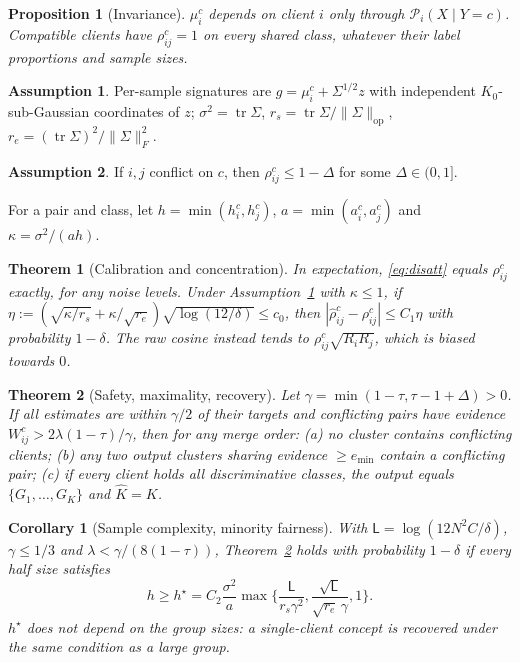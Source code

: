 \documentclass[journal]{IEEEtran}
\newtheorem{theorem}{Theorem}
\newtheorem{proposition}{Proposition}
\newtheorem{corollary}{Corollary}
\theoremstyle{definition}
\newtheorem{assumption}{Assumption}
\newcommand{\cP}{\mathcal{P}}
\newcommand{\tr}{\operatorname{tr}}
\newcommand{\op}{\mathrm{op}}
\newcommand{\rhohat}{\hat\rho}
\begin{document}
\begin{proposition}[Invariance]\label{prop:inv}
$\mu_i^c$ depends on client $i$ only through $\cP_i(X\mid Y=c)$. Compatible clients have $\rho^c_{ij}=1$ on every shared class, whatever their label proportions and sample sizes.
\end{proposition}
\begin{assumption}\label{ass:noise}
Per-sample signatures are $g=\mu_i^c+\Sigma^{1/2}z$ with independent $K_0$-sub-Gaussian coordinates of $z$; $\sigma^2=\tr\Sigma$, $r_s=\tr\Sigma/\|\Sigma\|_\op$, $r_e=(\tr\Sigma)^2/\|\Sigma\|_F^2$.
\end{assumption}
\begin{assumption}\label{ass:sep}
If $i,j$ conflict on $c$, then $\rho^c_{ij}\le1-\Delta$ for some $\Delta\in(0,1]$.
\end{assumption}
For a pair and class, let $h=\min(h_i^c,h_j^c)$, $a=\min(a_i^c,a_j^c)$ and $\kappa=\sigma^2/(ah)$.
\begin{theorem}[Calibration and concentration]\label{thm:conc}
In expectation, \eqref{eq:disatt} equals $\rho_{ij}^c$ exactly, for any noise levels. Under Assumption~\ref{ass:noise} with $\kappa\le1$, if $\eta:=(\sqrt{\kappa/r_s}+\kappa/\sqrt{r_e})\sqrt{\log(12/\delta)}\le c_0$, then $|\rhohat^c_{ij}-\rho^c_{ij}|\le C_1\eta$ with probability $1-\delta$. The raw cosine instead tends to $\rho^c_{ij}\sqrt{R_iR_j}$, which is biased towards $0$.
\end{theorem}
\begin{theorem}[Safety, maximality, recovery]\label{thm:rec}
Let $\gamma=\min(1-\tau,\tau-1+\Delta)>0$. If all estimates are within $\gamma/2$ of their targets and conflicting pairs have evidence $W^c_{ij}>2\lambda(1-\tau)/\gamma$, then for \emph{any} merge order: (a) no cluster contains conflicting clients; (b) any two output clusters sharing evidence $\ge e_{\min}$ contain a conflicting pair; (c) if every client holds all discriminative classes, the output equals $\{G_1,\dots,G_K\}$ and $\hat K=K$.
\end{theorem}
\begin{corollary}[Sample complexity, minority fairness]\label{cor:sc}
With $\mathsf L=\log(12N^2C/\delta)$, $\gamma\le1/3$ and $\lambda<\gamma/(8(1-\tau))$, Theorem~\ref{thm:rec} holds with probability $1-\delta$ if every half size satisfies
\begin{equation*}
h\ge h^\star=C_2\frac{\sigma^2}{a}\max\Big\{\frac{\mathsf L}{r_s\gamma^2},\frac{\sqrt{\mathsf L}}{\sqrt{r_e}\,\gamma},1\Big\}.
\end{equation*}
$h^\star$ does not depend on the group sizes: a single-client concept is recovered under the same condition as a large group.
\end{corollary}
\end{document}
